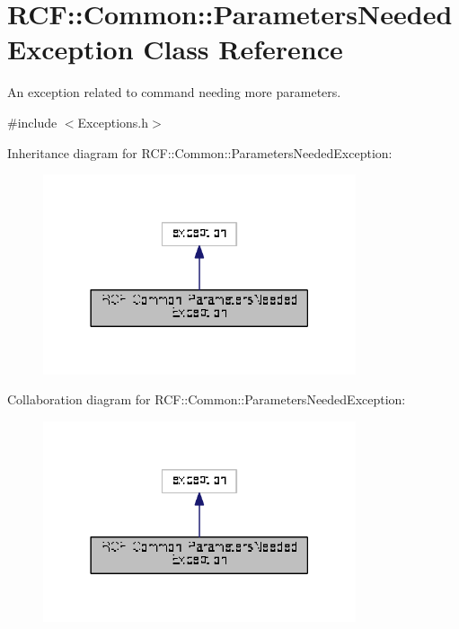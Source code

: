 \hypertarget{class_r_c_f_1_1_common_1_1_parameters_needed_exception}{}\section{R\+C\+F\+:\+:Common\+:\+:Parameters\+Needed\+Exception Class Reference}
\label{class_r_c_f_1_1_common_1_1_parameters_needed_exception}


An exception related to command needing more parameters.  




{\ttfamily \#include $<$Exceptions.\+h$>$}



Inheritance diagram for R\+C\+F\+:\+:Common\+:\+:Parameters\+Needed\+Exception\+:\nopagebreak
\begin{figure}[H]
\begin{center}
\leavevmode
\includegraphics[width=261pt]{class_r_c_f_1_1_common_1_1_parameters_needed_exception__inherit__graph}
\end{center}
\end{figure}


Collaboration diagram for R\+C\+F\+:\+:Common\+:\+:Parameters\+Needed\+Exception\+:\nopagebreak
\begin{figure}[H]
\begin{center}
\leavevmode
\includegraphics[width=261pt]{class_r_c_f_1_1_common_1_1_parameters_needed_exception__coll__graph}
\end{center}
\end{figure}
